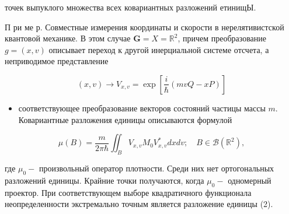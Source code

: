 \documentclass[10pt]{article}
\begin{document}
точек выпуклого множества всех ковариантных разложений етинищЫ.



П ри ме р. Совместные измерения координаты и скорости в нерелятивистской квантовой механике. В этом случае $\boldsymbol{G}=X=\mathbb{R}^{2}$, причем преобразование $g=(x, v)$ описывает переход к другой инерциальной системе отсчета, а неприводимое представление



\[

(x, v) \rightarrow V_{x, v}=\exp \left[\frac{i}{\hbar}(m v Q-x P)\right]

\]



\begin{itemize}

  \item соответствующее преобразование векторов состояний частицы массы $m$. Ковариантные разложения единицы описываются формулой

\end{itemize}



\[

\mu(B)=\frac{m}{2 \pi \hbar} \iint_{B} V_{x, v} M_{0} V_{x, v}^{*} d x d v ; \quad B \in \mathscr{B}\left(\mathbb{R}^{2}\right),

\]



где $\mu_{0}-$ произвольный оператор плотности. Среди них нет ортогональных разложений единицы. Крайние точки получаются, когда $\mu_{0}-$ одномерный проектор. При соответствующем выборе квадратичного функционала неопределенности экстремально точным является разложение единицы (2).
\end{document}
